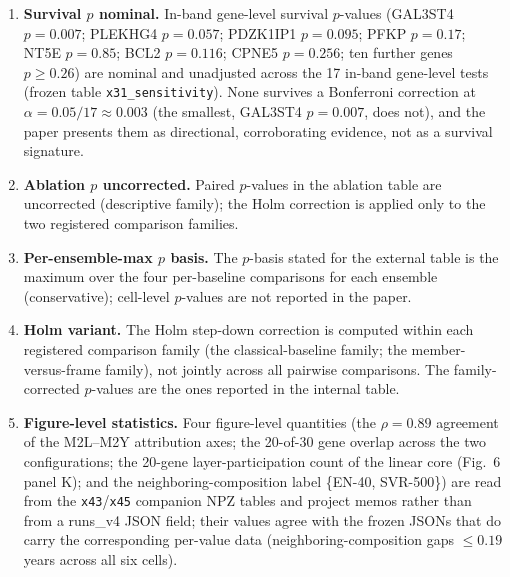 \documentclass[11pt]{article}
\begin{document}
\begin{enumerate}
elastic-net baseline was handed the extreme-age labels as ordinary regression
targets. The final tables do not include that control arm; the value is a
cross-generation structural control, not a fresh re-run on the shipped
configuration.
\item \textbf{Survival $p$ nominal.} In-band gene-level survival $p$-values
(GAL3ST4 $p=0.007$; PLEKHG4 $p=0.057$; PDZK1IP1 $p=0.095$; PFKP $p=0.17$;
NT5E $p=0.85$; BCL2 $p=0.116$; CPNE5 $p=0.256$; ten further genes
$p\ge 0.26$) are nominal and unadjusted
across the 17 in-band gene-level tests (frozen table \texttt{x31\_sensitivity}).
None survives a Bonferroni correction at $\alpha=0.05/17\approx 0.003$
(the smallest, GAL3ST4 $p=0.007$, does not), and the paper presents them as
directional, corroborating evidence, not as a survival signature.
\item \textbf{Ablation $p$ uncorrected.} Paired $p$-values in the ablation
table are uncorrected (descriptive family); the Holm correction is applied
only to the two registered comparison families.
\item \textbf{Per-ensemble-max $p$ basis.} The $p$-basis stated for the
external table is the maximum over the four per-baseline comparisons for each
ensemble (conservative); cell-level $p$-values are not reported in the paper.
\item \textbf{Holm variant.} The Holm step-down correction is computed within
each registered comparison family (the classical-baseline family; the
member-versus-frame family), not jointly across all pairwise comparisons. The
family-corrected $p$-values are the ones reported in the internal table.
\item \textbf{Figure-level statistics.} Four figure-level quantities (the $\rho=0.89$ agreement of the M2L--M2Y attribution axes; the 20-of-30 gene overlap across the two configurations; the 20-gene layer-participation count of the linear core (Fig.~6 panel K); and the neighboring-composition label \{EN-40, SVR-500\}) are read from the \texttt{x43}/\texttt{x45} companion NPZ tables and project memos rather than from a runs\_v4 JSON field; their values agree with the frozen JSONs that do carry the corresponding per-value data (neighboring-composition gaps $\le 0.19$ years across all six cells).
\end{enumerate}
\end{document}
